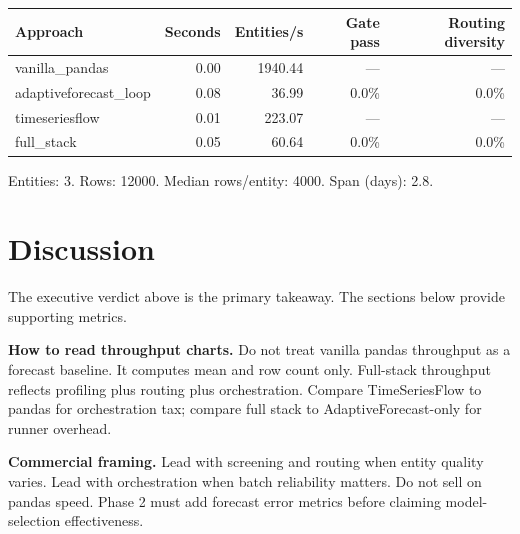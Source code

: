 \documentclass[11pt,a4paper]{article}
\begin{document}
\begin{tabular}{lrrrr}
\toprule
Approach & Seconds & Entities/s & Gate pass & Routing diversity \\
\midrule
vanilla\_pandas & 0.00 & 1940.44 & --- & --- \\
adaptiveforecast\_loop & 0.08 & 36.99 & 0.0\% & 0.0\% \\
timeseriesflow & 0.01 & 223.07 & --- & --- \\
full\_stack & 0.05 & 60.64 & 0.0\% & 0.0\% \\
\bottomrule
\end{tabular}

\vspace{0.3cm}
\noindent Entities: 3. Rows: 12000. Median rows/entity: 4000. Span (days): 2.8.


\section{Discussion}
The executive verdict above is the primary takeaway. The sections below provide supporting metrics.

\textbf{How to read throughput charts.}
Do not treat vanilla pandas throughput as a forecast baseline. It computes mean and row count only.
Full-stack throughput reflects profiling plus routing plus orchestration. Compare TimeSeriesFlow to
pandas for orchestration tax; compare full stack to AdaptiveForecast-only for runner overhead.

\textbf{Commercial framing.}
Lead with screening and routing when entity quality varies. Lead with orchestration when batch
reliability matters. Do not sell on pandas speed. Phase 2 must add forecast error metrics before
claiming model-selection effectiveness.
\end{document}
